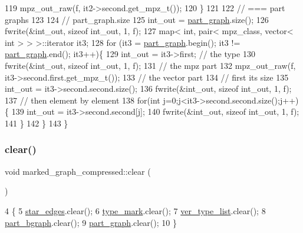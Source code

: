 \begin{DoxyCode}
119     mpz\_out\_raw(f, it2->second.get\_mpz\_t());
120   \}
121 
122   \textcolor{comment}{// === part graphs}
123 
124   \textcolor{comment}{// part\_graph.size}
125   int\_out = \hyperlink{classmarked__graph__compressed_ae179a4737e6eab905c18a94d44ef64b7}{part\_graph}.size();
126   fwrite(&int\_out, \textcolor{keyword}{sizeof} int\_out, 1, f);
127   map< int, pair< mpz\_class, vector< int > > >::iterator it3;
128   \textcolor{keywordflow}{for} (it3 = \hyperlink{classmarked__graph__compressed_ae179a4737e6eab905c18a94d44ef64b7}{part\_graph}.begin(); it3 != \hyperlink{classmarked__graph__compressed_ae179a4737e6eab905c18a94d44ef64b7}{part\_graph}.end(); it3++)\{
129     int\_out = it3->first; \textcolor{comment}{// the type}
130     fwrite(&int\_out, \textcolor{keyword}{sizeof} int\_out, 1, f);
131     \textcolor{comment}{// the mpz part}
132     mpz\_out\_raw(f, it3->second.first.get\_mpz\_t());
133     \textcolor{comment}{// the vector part}
134     \textcolor{comment}{// first its size}
135     int\_out = it3->second.second.size();
136     fwrite(&int\_out, \textcolor{keyword}{sizeof} int\_out, 1, f);
137     \textcolor{comment}{// then element by element}
138     \textcolor{keywordflow}{for}(\textcolor{keywordtype}{int} j=0;j<it3->second.second.size();j++)\{
139       int\_out = it3->second.second[j];
140       fwrite(&int\_out, \textcolor{keyword}{sizeof} int\_out, 1, f);
141     \}
142   \}
143 \}
\end{DoxyCode}
\mbox{\label{classmarked__graph__compressed_af58307bfadcaa4c3ca6dd594c2f9b3a9}} 
\subsubsection{\texorpdfstring{clear()}{clear()}}
{\footnotesize\ttfamily void marked\+\_\+graph\+\_\+compressed\+::clear (\begin{DoxyParamCaption}{ }\end{DoxyParamCaption})}


\begin{DoxyCode}
4 \{
5   \hyperlink{classmarked__graph__compressed_a7df5779d313486644132bd816937f532}{star\_edges}.clear();
6   \hyperlink{classmarked__graph__compressed_a86b00223525703e973415cbc9c94da68}{type\_mark}.clear();
7   \hyperlink{classmarked__graph__compressed_af2e3e55223d436628a02758dfae88493}{ver\_type\_list}.clear();
8   \hyperlink{classmarked__graph__compressed_a7b3267063fba30b45eb21b3ba4e07536}{part\_bgraph}.clear();
9   \hyperlink{classmarked__graph__compressed_ae179a4737e6eab905c18a94d44ef64b7}{part\_graph}.clear();
10 \}
\end{DoxyCode}


